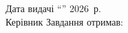 \begin{center}
\begin{flushleft}
        Дата видачі ``\underline{\hspace{1cm}}'' \underline{\hspace{3cm}} 2026~р.\\
        Керівник \underline{\hspace{5cm}} Завдання отримав: \underline{\hspace{3cm}}
    \end{flushleft}
\end{center}
\newpage